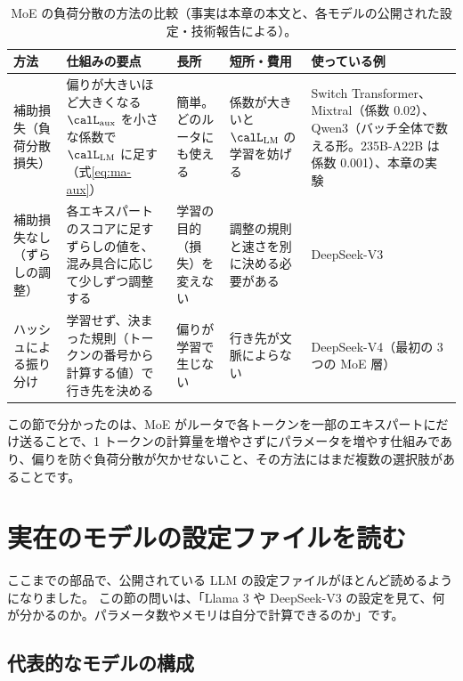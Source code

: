 \begin{table}[tbp]
\centering
\caption{MoE の負荷分散の方法の比較（事実は本章の本文と、各モデルの公開された設定・技術報告による）。}
\label{tab:ma-balance}
\footnotesize
\setlength{\tabcolsep}{3pt}
\begin{tabular}{@{}>{\raggedright\arraybackslash}p{21mm}>{\raggedright\arraybackslash}p{30mm}>{\raggedright\arraybackslash}p{21mm}>{\raggedright\arraybackslash}p{24mm}>{\raggedright\arraybackslash}p{24mm}@{}}
\toprule
方法 & 仕組みの要点 & 長所 & 短所・費用 & 使っている例 \\
\midrule
補助損失（負荷分散損失） & 偏りが大きいほど大きくなる $\calL_{\mathrm{aux}}$ を小さな係数で $\calL_{\mathrm{LM}}$ に足す（式\eqref{eq:ma-aux}） & 簡単。どのルータにも使える & 係数が大きいと $\calL_{\mathrm{LM}}$ の学習を妨げる & Switch Transformer、Mixtral（係数 0.02）、Qwen3（バッチ全体で数える形。235B-A22B は係数 0.001）、本章の実験 \\
補助損失なし（ずらしの調整） & 各エキスパートのスコアに足すずらしの値を、混み具合に応じて少しずつ調整する & 学習の目的（損失）を変えない & 調整の規則と速さを別に決める必要がある & DeepSeek-V3 \\
ハッシュによる振り分け & 学習せず、決まった規則（トークンの番号から計算する値）で行き先を決める & 偏りが学習で生じない & 行き先が文脈によらない & DeepSeek-V4（最初の 3 つの MoE 層） \\
\bottomrule
\end{tabular}
\end{table}


この節で分かったのは、MoE がルータで各トークンを一部のエキスパートにだけ送ることで、1 トークンの計算量を増やさずにパラメータを増やす仕組みであり、偏りを防ぐ負荷分散が欠かせないこと、その方法にはまだ複数の選択肢があることです。

\section{実在のモデルの設定ファイルを読む}\label{sec:ma-models}

ここまでの部品で、公開されている LLM の設定ファイルがほとんど読めるようになりました。
この節の問いは、「Llama 3 や DeepSeek-V3 の設定を見て、何が分かるのか。パラメータ数やメモリは自分で計算できるのか」です。

\subsection*{代表的なモデルの構成}


